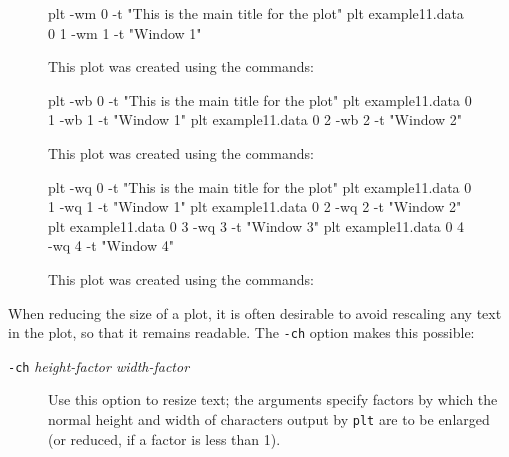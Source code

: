 \documentclass{book}
\begin{document}
\begin{figure}[h]
\begin{center}
\caption[Single-window framed plot]{This plot was created using the commands:
\label{fig:example11}}

\begin{boxedverbatim}
plt -wm 0 -t "This is the main title for the plot"
plt example11.data 0 1 -wm 1 -t "Window 1"
\end{boxedverbatim}
\end{center}
\end{figure}

\begin{figure}
\begin{center}
\caption[Two-window framed plot]{This plot was created using the commands:
\label{fig:example12}}

\begin{boxedverbatim}
plt -wb 0 -t "This is the main title for the plot"
plt example11.data 0 1 -wb 1 -t "Window 1"
plt example11.data 0 2 -wb 2 -t "Window 2"
\end{boxedverbatim}
\end{center}
\end{figure}

\begin{figure}
\begin{center}
\caption[Four-window framed plot]{This plot was created using the commands:
\label{fig:example13}}

\begin{boxedverbatim}
plt -wq 0 -t "This is the main title for the plot"
plt example11.data 0 1 -wq 1 -t "Window 1"
plt example11.data 0 2 -wq 2 -t "Window 2"
plt example11.data 0 3 -wq 3 -t "Window 3"
plt example11.data 0 4 -wq 4 -t "Window 4"
\end{boxedverbatim}
\end{center}
\end{figure}

%
%
When reducing the size of a plot, it is often desirable to avoid rescaling
any text in the plot, so that it remains readable.  The {\tt -ch} option
makes this possible:

\begin{description}
\item[{\tt -ch} {\em height-factor width-factor}]
Use this option to resize text;  the arguments specify factors by which the
normal height and width of characters output by {\tt plt} are to be enlarged
(or reduced, if a factor is less than 1).
\end{description}
\end{document}
